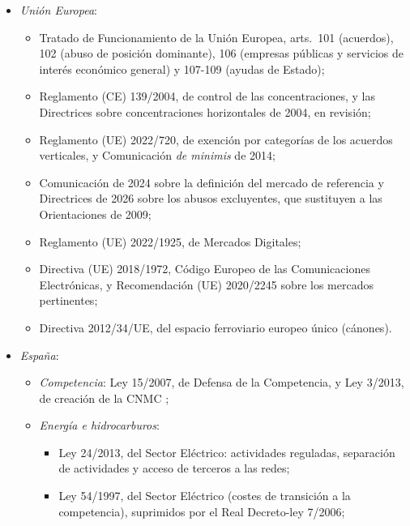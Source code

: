 \documentclass[11pt]{article}
\begin{document}
\begin{itemize}
\item \emph{Unión Europea}:
  \begin{itemize}
  \item Tratado de Funcionamiento de la Unión Europea, arts.~101 (acuerdos), 102 (abuso de posición dominante), 106 (empresas públicas y servicios de interés económico general) y 107-109 (ayudas de Estado)\nocite{UE2016TFUE};
  \item Reglamento (CE) 139/2004, de control de las concentraciones\nocite{UE2004Reglamento139}, y las Directrices sobre concentraciones horizontales de 2004, en revisión\nocite{CE2004Horizontales,CE2026RevisionMerger};
  \item Reglamento (UE) 2022/720, de exención por categorías de los acuerdos verticales\nocite{UE2022RECAV}, y Comunicación \emph{de minimis} de 2014\nocite{CE2014DeMinimis};
  \item Comunicación de 2024 sobre la definición del mercado de referencia\nocite{CE2024DefinicionMercado} y Directrices de 2026 sobre los abusos excluyentes, que sustituyen a las Orientaciones de 2009\nocite{CE2026DirectricesExclusion};
  \item Reglamento (UE) 2022/1925, de Mercados Digitales\nocite{UE2022DMA};
  \item Directiva (UE) 2018/1972, Código Europeo de las Comunicaciones Electrónicas\nocite{UE2018CECE}, y Recomendación (UE) 2020/2245 sobre los mercados pertinentes\nocite{UE2020RecomendacionMercados};
  \item Directiva 2012/34/UE, del espacio ferroviario europeo único (cánones)\nocite{UE2012Directiva34}.
  \end{itemize}
\item \emph{España}:
  \begin{itemize}
  \item \emph{Competencia}: Ley 15/2007, de Defensa de la Competencia\nocite{BOE2007LDC}, y Ley 3/2013, de creación de la CNMC\nocite{Ley3_2013CNMC} ;
  \item \emph{Energía e hidrocarburos}:
    \begin{itemize}
    \item Ley 24/2013, del Sector Eléctrico: actividades reguladas, separación de actividades y acceso de terceros a las redes\nocite{Ley24_2013SectorElectrico};
    \item Ley 54/1997, del Sector Eléctrico (costes de transición a la competencia)\nocite{BOE1997LSE}, suprimidos por el Real Decreto-ley 7/2006\nocite{BOE2006RDL7};

\end{itemize}
\end{itemize}
\end{itemize}
\end{document}
